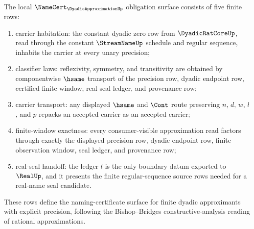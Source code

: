\begin{theorem}
\label{thm:dyadic-approximation-window-obligations}
The local $\NameCert_{\DyadicApproximationUp}$ obligation surface consists of five finite rows:
\begin{enumerate}
\item carrier habitation: the constant dyadic zero row from $\DyadicRatCoreUp$, read through the constant $\StreamNameUp$ schedule and regular sequence, inhabits the carrier at every unary precision;
\item classifier laws: reflexivity, symmetry, and transitivity are obtained by componentwise $\hsame$ transport of the precision row, dyadic endpoint row, certified finite window, real-seal ledger, and provenance row;
\item carrier transport: any displayed $\hsame$ and $\Cont$ route preserving $n$, $d$, $w$, $l$, and $p$ repacks an accepted carrier as an accepted carrier;
\item finite-window exactness: every consumer-visible approximation read factors through exactly the displayed precision row, dyadic endpoint row, finite observation window, seal ledger, and provenance row;
\item real-seal handoff: the ledger $l$ is the only boundary datum exported to $\RealUp$, and it presents the finite regular-sequence source rows needed for a real-name seal candidate.
\end{enumerate}
These rows define the naming-certificate surface for finite dyadic approximants with explicit precision, following the Bishop--Bridges constructive-analysis reading of rational approximations.
\end{theorem}
